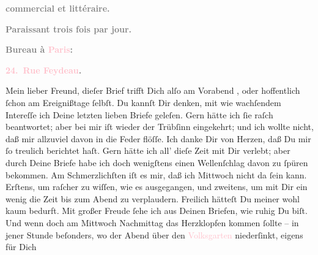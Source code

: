            \pstart
           \begin{otherlanguage}{french}\textcolor{gray}{\textbf{commercial et littéraire.}}\end{otherlanguage}\pend
           \pstart
           \begin{otherlanguage}{french}\textcolor{gray}{\textbf{\textbf{Paraissant trois fois par jour.}}}\end{otherlanguage}\pend
           \pstart
           \begin{otherlanguage}{french}\textcolor{gray}{\textbf{\textbf{Bureau à \textcolor{pink}{Paris}{}\ledrightnote{\textcolor{pink}{Paris}}:}}}\end{otherlanguage}\pend
           \pstart
           \begin{otherlanguage}{french}\textcolor{gray}{\textbf{\textbf{\textcolor{pink}{24. Rue Feydeau}{}\ledrightnote{\textcolor{pink}{rue Feydeau}}.}}}\end{otherlanguage}\pend
           \pstart\center{}Mein lieber Freund,\pend\pstart
           dieſer Brief trifft Dich alſo am Vorabend{ }\label{K_L02750-1v}\label{K_L02750-1h}, oder hoffentlich ſchon am Ereignißtage
               ſelbſt. Du kannſt Dir denken, mit wie wachſendem Intereſſe ich Deine letzten lieben
               Briefe geleſen. Gern hätte ich ſie raſch beantwortet; aber bei mir iſt wieder der
               Trübſinn eingekehrt; und ich wollte nicht, daß mir allzuviel davon in die Feder
               flöſſe. Ich danke Dir \strikeout{\textcolor{gray}{×}} von Herzen, daß Du mir ſo treulich berichtet haſt. Gern  hätte ich all’ dieſe Zeit {\pb}mit Dir verlebt; aber durch Deine Briefe habe ich
               doch wenigſtens einen Wellenſchlag davon zu ſpüren bekommen. Am \strikeout{\textcolor{gray}{Schwerſten}} Schmerzlichſten iſt es mir, daß ich Mittwoch
               nicht da ſein kann. Erſtens, um raſcher zu wiſſen, wie es ausgegangen, und zweitens,
               um  mit Dir ein wenig die Zeit bis zum Abend zu verplaudern. Freilich
               hätteſt Du meiner wohl kaum bedurft. Mit großer Freude ſehe ich aus Deinen Briefen,
               wie ruhig Du biſt. Und wenn doch am Mittwoch{ }Nachmittag das Herzklopfen kommen ſollte – in jener Stunde beſonders, wo
               der Abend über den {\pb}\strikeout{\textcolor{gray}{×}\-\textcolor{gray}{×}\-\textcolor{gray}{×}\-\textcolor{gray}{×}\-\textcolor{gray}{×}\-\textcolor{gray}{×}\-\textcolor{gray}{×}}{ }\textcolor{pink}{Volksgarten}{}\ledrightnote{\textcolor{pink}{Volksgarten}} niederſinkt, eigens für Dich
